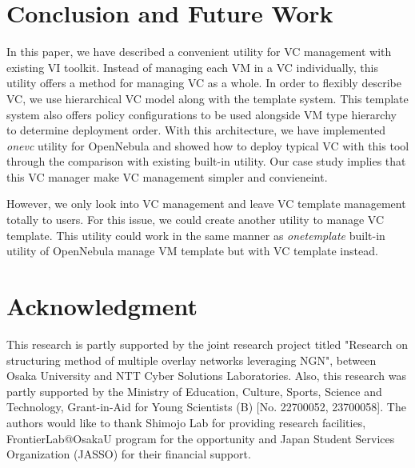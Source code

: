\documentclass[conference]{IEEEtran}
\begin{document}
\section{Conclusion and Future Work}
In this paper, we have described a convenient utility for VC management with existing VI toolkit.
Instead of managing each VM in a VC individually, this utility offers a method for managing VC as a whole.
In order to flexibly describe VC, we use hierarchical VC model along with the template system.
This template system also offers policy configurations to be used alongside VM type hierarchy to determine deployment order.
With this architecture, we have implemented \emph{onevc} utility for OpenNebula and showed how to deploy typical VC with this tool through the comparison with existing built-in utility.
Our case study implies that this VC manager make VC management simpler and convieneint.

However, we only look into VC management and leave VC template management totally to users.
For this issue, we could create another utility to manage VC template.
This utility could work in the same manner as \emph{onetemplate} built-in utility of OpenNebula manage VM template but with VC template instead.



\section*{Acknowledgment}
This research is partly supported by the joint research project titled "Research on structuring method of multiple overlay networks leveraging NGN", between Osaka University and NTT Cyber Solutions Laboratories. Also, this research was partly supported by the Ministry of Education, Culture, Sports, Science and Technology, Grant-in-Aid for Young Scientists (B) [No. 22700052, 23700058].
The authors would like to thank Shimojo Lab for providing research facilities, FrontierLab@OsakaU program for the opportunity and Japan Student Services Organization (JASSO) for their financial support.





\end{document}
